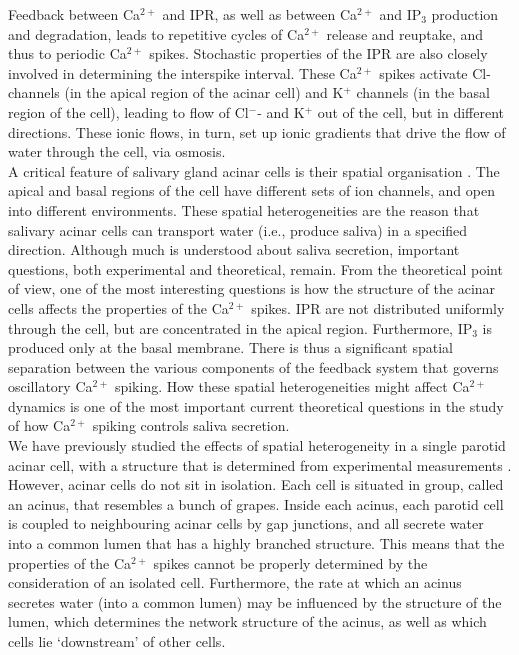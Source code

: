 \documentclass[a4paper,10pt]{article}
\begin{document}
Feedback between Ca$^{2+}$ and IPR, as well as between Ca$^{2+}$ and IP$_3$ production and degradation, leads to repetitive cycles of Ca$^{2+}$ release and reuptake, and thus to periodic Ca$^{2+}$ spikes. Stochastic properties of the IPR are also closely involved in determining the interspike interval.
These Ca$^{2+}$ spikes activate Cl- channels (in the apical region of the acinar cell) and K$^+$ channels (in the basal region of the cell), leading to flow of Cl$^{-}$- and K$^{+}$ out of the cell, but in different directions. These ionic flows, in turn, set up ionic gradients that drive the flow of water through the cell, via osmosis.\\

A critical feature of salivary gland acinar cells is their spatial organisation \cite{Sneyd2017383}. The apical and basal regions of the cell have different sets of ion channels, and open into different environments. These spatial heterogeneities are the reason that salivary acinar cells can transport water (i.e., produce saliva) in a specified direction.
Although much is understood about saliva secretion, important questions, both experimental and theoretical, remain. From the theoretical point of view, one of the most interesting questions is how the structure of the acinar cells affects the properties of the Ca$^{2+}$ spikes. IPR are not distributed uniformly through the cell, but are concentrated in the apical region. Furthermore, IP$_3$ is produced only at the basal membrane. There is thus a significant spatial separation between the various components of the feedback system that governs oscillatory Ca$^{2+}$ spiking. How these spatial heterogeneities might affect Ca$^{2+}$ dynamics is one of the most important current theoretical questions in the study of how Ca$^{2+}$ spiking controls saliva secretion.\\

We have previously studied the effects of spatial heterogeneity in a single parotid acinar cell, with a structure that is determined from experimental measurements \cite{sneyd2003}. However, acinar cells do not sit in isolation. Each cell is situated in group, called an acinus, that resembles a bunch of grapes. Inside each acinus, each parotid cell is coupled to neighbouring acinar cells by gap junctions, and all secrete water into a common lumen that has a highly branched structure. This means that the properties of the Ca$^{2+}$ spikes cannot be properly determined by the consideration of an isolated cell. Furthermore, the rate at which an acinus secretes water (into a common lumen) may be influenced by the structure of the lumen, which determines the network structure of the acinus, as well as which cells lie `downstream' of other cells.\\
\end{document}
